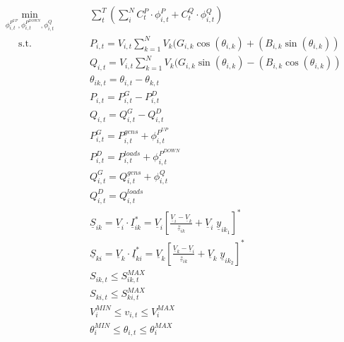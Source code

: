 \begin{subequations}
\begin{alignat}{2}
&\!\min_{\phi_{i,t}^{P^{UP}},\phi_{i,t}^{P^{DOWN}},\phi_{i,t}^{Q}}  &\qquad& \sum_{t}^{T} \left( \sum_{i}^{N} C_t^{P} \cdot \phi_{i,t}^{P} + C_t^{Q} \cdot \phi_{i,t}^{Q} \right) \label{eq:optProb}\\ 
&\phantom{Mi} \text{s.t.} &      & P_{i,t} = V_{i,t} \sum_{k=1}^{N} V_{k} (G_{i,k} \cos(\theta_{i,k}) + (B_{i,k} \sin(\theta_{i,k})) \label{eq:activepowernodalbalance} \\ 
&				   &      & Q_{i,t} = V_{i,t} \sum_{k=1}^{N} V_{k} (G_{i,k} \sin(\theta_{i,k}) - (B_{i,k} \cos(\theta_{i,k})) \label{eq:reactivepowernodalbalance} \\
&                  &      & \theta_{ik,t} = \theta_{i,t} - \theta_{k,t}\label{eq:voltageangle} \\
&                  &      & P_{i,t} = P_{i,t}^{G} - P_{i,t}^{D} \label{eq:Pi} \\
&                  &      & Q_{i,t} = Q_{i,t}^{G} - Q_{i,t}^{D}  \label{eq:Qi} \\
& 				   & & P_{i,t}^{G} = P_{i,t}^{gens} + \phi_{i,t}^{P^{UP}}    \\
&  				   & & P_{i,t}^{D} = P_{i,t}^{loads} + \phi_{i,t}^{P^{DOWN}}  \\
& 				   & & Q_{i,t}^{G} = Q_{i,t}^{gens} + \phi_{i,t}^{Q}    \\
& 				   & & Q_{i,t}^{D} = Q_{i,t}^{loads}    \\
&                  &      & \underline{S}_{ik} = \underline{V}_{i} \cdot \underline{I}_{ik}^{*} = \underline{V}_{i} \left[ \frac{\underline{V}_{i} - \underline{V}_{k}}{\underline{z}_{ik}} + \underline{V}_{i} \; \underline{y}_{ik_1} \right]^{*}  \label{eq:apparentflowlineik} \\
&                  &      & \underline{S}_{ki} = \underline{V}_{k} \cdot \underline{I}_{ki}^{*} = \underline{V}_{k} \left[ \frac{\underline{V}_{k} - \underline{V}_{i}}{\underline{z}_{ik}} + \underline{V}_{k} \;  \underline{y}_{ik_2} \right]^{*}  \label{eq:apparentflowlineki} \\
&                  &      &  S_{ik,t} \leq S_{ik,t}^{MAX}  \label{eq:Siklimit} \\
&                  &      &  S_{ki,t} \leq S_{ki,t}^{MAX}   \label{eq:Skilimit} \\ 
&                  &      &  V_{i}^{MIN} \leq v_{i,t} \leq V_{i}^{MAX}  \label{eq:voltagelimit} \\
&                  &      & \theta_{i}^{MIN} \leq \theta_{i,t}  \leq \theta_{i}^{MAX}  \label{eq:voltageangle}
\end{alignat}
\end{subequations}


